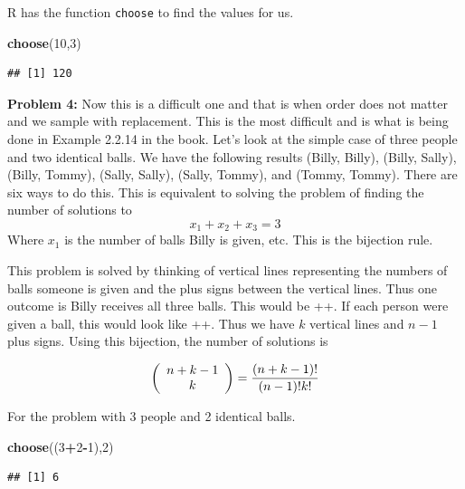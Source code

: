 \documentclass[]{book}
\newenvironment{Shaded}{\begin{snugshade}}{\end{snugshade}}
\newcommand{\KeywordTok}[1]{\textcolor[rgb]{0.13,0.29,0.53}{\textbf{#1}}}
\newcommand{\DecValTok}[1]{\textcolor[rgb]{0.00,0.00,0.81}{#1}}
\newcommand{\OperatorTok}[1]{\textcolor[rgb]{0.81,0.36,0.00}{\textbf{#1}}}
\newcommand{\NormalTok}[1]{#1}
\theoremstyle{definition}
\theoremstyle{definition}
\theoremstyle{definition}
\theoremstyle{remark}
\begin{document}
R has the function \texttt{choose} to find the values for us.

\begin{Shaded}
\begin{Highlighting}[]
\KeywordTok{choose}\NormalTok{(}\DecValTok{10}\NormalTok{,}\DecValTok{3}\NormalTok{)}
\end{Highlighting}
\end{Shaded}

\begin{verbatim}
## [1] 120
\end{verbatim}

\textbf{Problem 4:} Now this is a difficult one and that is when order
does not matter and we sample with replacement. This is the most
difficult and is what is being done in Example 2.2.14 in the book. Let's
look at the simple case of three people and two identical balls. We have
the following results (Billy, Billy), (Billy, Sally), (Billy, Tommy),
(Sally, Sally), (Sally, Tommy), and (Tommy, Tommy). There are six ways
to do this. This is equivalent to solving the problem of finding the
number of solutions to \[x_1 + x_2 + x_3 =3\] Where \(x_1\) is the
number of balls Billy is given, etc. This is the bijection rule.

This problem is solved by thinking of vertical lines representing the
numbers of balls someone is given and the plus signs between the
vertical lines. Thus one outcome is Billy receives all three balls. This
would be \textbar{}\textbar{}\textbar{}++. If each person were given a
ball, this would look like \textbar{}+\textbar{}+\textbar{}. Thus we
have \(k\) vertical lines and \(n-1\) plus signs. Using this bijection,
the number of solutions is

\[\left( {\begin{array}{c}n+k-1 \\ k \end{array}} \right) = {(n+k-1)! \over (n-1)!k!}\]

For the problem with 3 people and 2 identical balls.

\begin{Shaded}
\begin{Highlighting}[]
\KeywordTok{choose}\NormalTok{((}\DecValTok{3}\OperatorTok{+}\DecValTok{2}\OperatorTok{-}\DecValTok{1}\NormalTok{),}\DecValTok{2}\NormalTok{)}
\end{Highlighting}
\end{Shaded}

\begin{verbatim}
## [1] 6
\end{verbatim}
\end{document}
